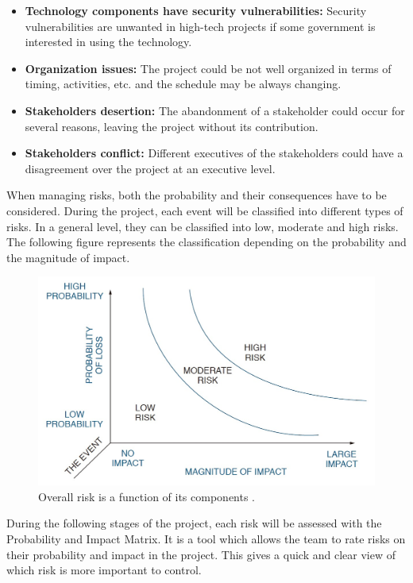 \begin{itemize}
	\item \textbf{Technology components have security vulnerabilities:} Security vulnerabilities are unwanted in high-tech projects if some government is interested in using the technology.
	
	\item \textbf{Organization issues:} The project could be not well organized in terms of timing, activities, etc. and the schedule may be always changing.
	
	\item \textbf{Stakeholders desertion:} The abandonment of a stakeholder could occur for several reasons, leaving the project without its contribution.
	
	\item \textbf{Stakeholders conflict:} Different executives of the stakeholders could have a disagreement over the project at an executive level.
	
	
\end{itemize}

When managing risks, both the probability and their consequences have to be considered. During the project, each event will be classified into different types of risks. In a general level, they can be classified into low, moderate and high risks. The following figure represents the classification depending on the probability and the magnitude of impact.

\begin{figure}[H]
	\centering
	\includegraphics[width=0.65\linewidth]{./images/risks1}
	\caption{Overall risk is a function of its components \cite{Kerzner2009}.}
	\label{fig:risks1}
\end{figure}

During the following stages of the project, each risk will be assessed with the Probability and Impact Matrix. It is a tool which allows the team to rate risks on their probability and impact in the project. This gives a quick and clear view of which risk is more important to control.

